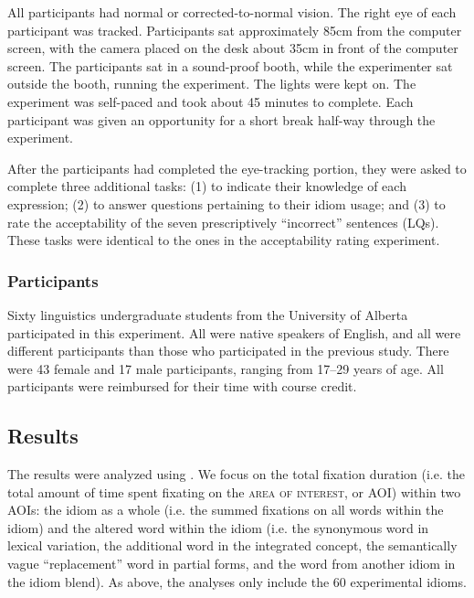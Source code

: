 \documentclass[output=paper,modfonts,nonflat]{langsci/langscibook}
\begin{document}
All participants had normal or corrected-to-normal vision. The right eye of each participant was tracked. Participants sat approximately 85cm from the computer screen, with the camera placed on the desk about 35cm in front of the computer screen. The participants sat in a sound-proof booth, while the experimenter sat outside the booth, running the experiment. The lights were kept on. The experiment was self-paced and took about 45 minutes to complete. Each participant was given an opportunity for a short break half-way through the experiment.

After the participants had completed the eye-tracking portion, they were asked to complete three additional tasks: (1) to indicate their knowledge of each expression; (2) to answer questions pertaining to their idiom usage; and (3) to rate the acceptability of the seven prescriptively ``incorrect'' sentences (LQs). These tasks were identical to the ones in the acceptability rating experiment.



\subsubsection{Participants}

Sixty linguistics undergraduate students from the University of Alberta participated in this experiment. All were native speakers of English, and all were different participants than those who participated in the previous study. There were 43 female and 17 male participants, ranging from 17--29 years of age. All participants were reimbursed for their time with course credit.



\subsection{Results}

The results were analyzed using . We focus on the total fixation duration (i.e. the total amount of time spent fixating on the \textsc{area of interest}, or AOI) within two AOIs: the idiom as a whole (i.e. the summed fixations on all words within the idiom) and the altered word within the idiom (i.e. the synonymous word in lexical variation, the additional word in the integrated concept, the semantically vague ``replacement'' word in partial forms, and the word from another idiom in the idiom blend). As above, the analyses only include the 60 experimental idioms. %
\end{document}
